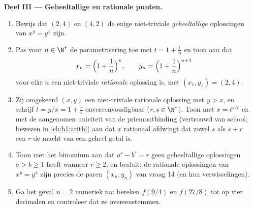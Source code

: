 \begin{problem}
\medskip
\noindent\textbf{Deel III --- Geheeltallige en rationale punten.}
\begin{enumerate}[resume]
  \item Bewijs dat $(2, 4)$ en $(4, 2)$ de enige niet-triviale
        \emph{geheeltallige} oplossingen van $x^y = y^x$ zijn.
  \item Pas voor $n \in \N^*$ de parametrisering toe met $t = 1 +
        \frac1n$ en toon aan dat
        \[
        x_n = \Bigl(1 + \frac1n\Bigr)^{n},
        \qquad
        y_n = \Bigl(1 + \frac1n\Bigr)^{n+1}
        \]
        voor elke $n$ een niet-triviale \emph{rationale} oplossing is,
        met $(x_1, y_1) = (2, 4)$.
  \item Zij omgekeerd $(x, y)$ een niet-triviale rationale oplossing
        met $y > x$, en schrijf $t = y/x = 1 + \frac rs$
        onvereenvoudigbaar ($r, s \in \N^*$). Toon met $x = t^{s/r}$ en
        met de aangenomen uniciteit van de priemontbinding (vertrouwd
        van school; bewezen in \cref{ch:b1:arith}) aan dat $x$
        rationaal afdwingt dat zowel $s$ als $s + r$ een $r$-de macht
        van een geheel getal is.
  \item Toon met het binomium aan dat $a^r - b^r = r$ geen geheeltallige
        oplossingen $a > b \geq 1$ heeft wanneer $r \geq 2$, en
        besluit: de rationale oplossingen van $x^y = y^x$ zijn precies
        de paren $(x_n, y_n)$ van vraag 14 (en hun verwisselingen).
  \item Ga het geval $n = 2$ numeriek na: bereken $f(9/4)$ en $f(27/8)$
        tot op vier decimalen en controleer dat ze overeenstemmen.
\end{enumerate}


\end{problem}
